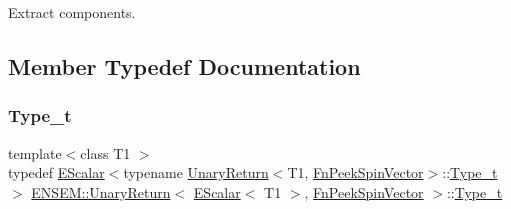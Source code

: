 Extract components. 

\subsection{Member Typedef Documentation}
\mbox{\label{structENSEM_1_1UnaryReturn_3_01EScalar_3_01T1_01_4_00_01FnPeekSpinVector_01_4_ab36dc210813249d571d0447c7da504ac}} 
\subsubsection{\texorpdfstring{Type\_t}{Type\_t}\hspace{0.1cm}{\footnotesize\ttfamily [1/2]}}
{\footnotesize\ttfamily template$<$class T1 $>$ \\
typedef \mbox{\hyperlink{classENSEM_1_1EScalar}{E\+Scalar}}$<$typename \mbox{\hyperlink{structENSEM_1_1UnaryReturn}{Unary\+Return}}$<$T1, \mbox{\hyperlink{structENSEM_1_1FnPeekSpinVector}{Fn\+Peek\+Spin\+Vector}}$>$\+::\mbox{\hyperlink{structENSEM_1_1UnaryReturn_3_01EScalar_3_01T1_01_4_00_01FnPeekSpinVector_01_4_ab36dc210813249d571d0447c7da504ac}{Type\+\_\+t}}$>$ \mbox{\hyperlink{structENSEM_1_1UnaryReturn}{E\+N\+S\+E\+M\+::\+Unary\+Return}}$<$ \mbox{\hyperlink{classENSEM_1_1EScalar}{E\+Scalar}}$<$ T1 $>$, \mbox{\hyperlink{structENSEM_1_1FnPeekSpinVector}{Fn\+Peek\+Spin\+Vector}} $>$\+::\mbox{\hyperlink{structENSEM_1_1UnaryReturn_3_01EScalar_3_01T1_01_4_00_01FnPeekSpinVector_01_4_ab36dc210813249d571d0447c7da504ac}{Type\+\_\+t}}}

\mbox{\label{structENSEM_1_1UnaryReturn_3_01EScalar_3_01T1_01_4_00_01FnPeekSpinVector_01_4_ab36dc210813249d571d0447c7da504ac}} 
